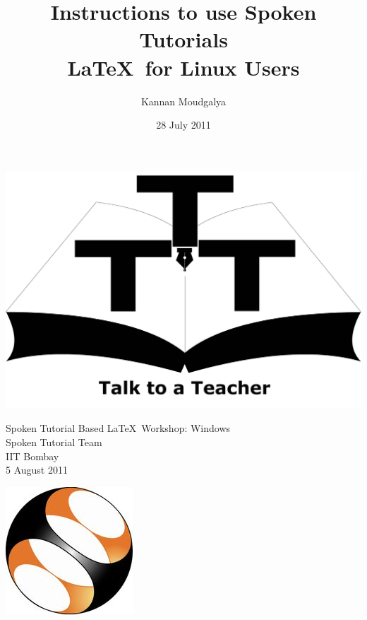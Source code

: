 \documentclass[11pt]{article}
\title{Instructions to use Spoken Tutorials \\
\LaTeX\ for Linux Users}
\author{Kannan Moudgalya}
\date{28 July 2011}
\begin{document}
\begin{minipage}[t]{0.15\textwidth}
\includegraphics[width=\linewidth]{3t-logo}
\end{minipage} \hfill
\begin{minipage}[t]{0.68\textwidth}
\begin{center}
\vspace{-0.7in}
\Large
Spoken Tutorial Based \LaTeX\ Workshop: Windows \\
\large
Spoken Tutorial Team \\
IIT Bombay \\
5 August 2011
\end{center}
\end{minipage} \hfill
\begin{minipage}[t]{0.12\textwidth}
\includegraphics[width=\linewidth]{st-logo.jpg}
\end{minipage}
\end{document}
